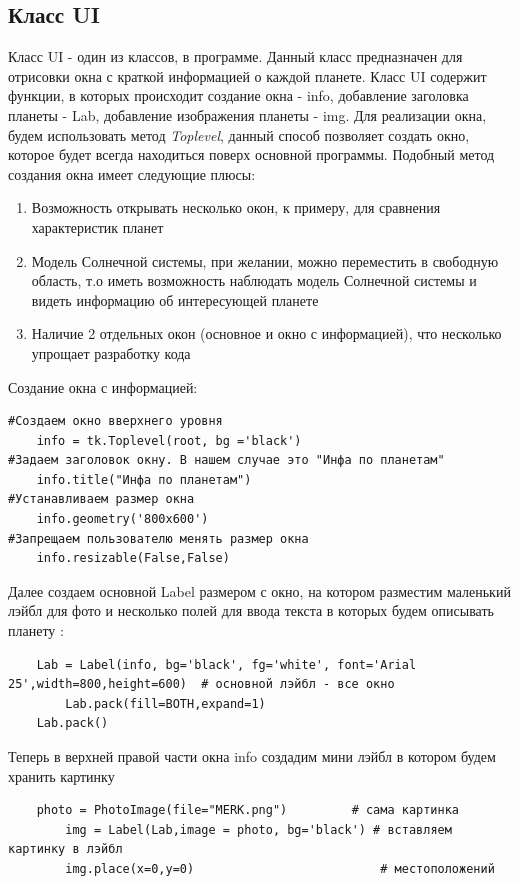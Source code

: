 \documentclass[11pt,a4paper]{report}
\begin{document}
\subsection{Класс UI}

Класс UI - один из классов, в программе. Данный класс предназначен для отрисовки окна с краткой информацией о каждой планете.
Класс UI содержит функции, в которых происходит создание окна  - info, добавление заголовка планеты - Lab, добавление изображения планеты - img. 
Для реализации окна, будем использовать метод \textit{Toplevel}, данный способ позволяет создать окно, которое будет всегда находиться поверх основной программы. 
Подобный метод создания окна имеет следующие плюсы:
\begin{enumerate}
    \item Возможность открывать несколько окон, к примеру, для сравнения характеристик планет
    \item Модель Солнечной системы, при желании, можно переместить в свободную область, т.о иметь возможность наблюдать модель Солнечной системы и видеть информацию об интересующей планете
    \item Наличие 2 отдельных окон (основное и окно с информацией), что несколько упрощает разработку кода
\end{enumerate}
Создание окна с информацией:
\begin{verbatim}
#Создаем окно вверхнего уровня
    info = tk.Toplevel(root, bg ='black')
#Задаем заголовок окну. В нашем случае это "Инфа по планетам"
    info.title("Инфа по планетам")
#Устанавливаем размер окна
    info.geometry('800x600')
#Запрещаем пользователю менять размер окна
    info.resizable(False,False)
\end{verbatim}
Далее создаем основной   Label размером с окно, на котором разместим маленький лэйбл для фото и несколько полей для ввода текста в которых будем описывать планету :
\begin{verbatim}
    Lab = Label(info, bg='black', fg='white', font='Arial 25',width=800,height=600)  # основной лэйбл - все окно
        Lab.pack(fill=BOTH,expand=1)
    Lab.pack()
\end{verbatim}
Теперь в верхней правой части окна info создадим  мини лэйбл  в котором будем хранить картинку 
\begin{verbatim}
    photo = PhotoImage(file="MERK.png")         # сама картинка
        img = Label(Lab,image = photo, bg='black') # вставляем картинку в лэйбл
        img.place(x=0,y=0)                          # местоположений
\end{verbatim}        
\end{document}
